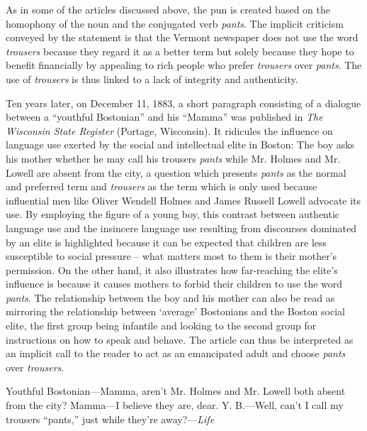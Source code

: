 As in some of the articles discussed above, the pun is created based on the homophony of the noun and the conjugated verb \emph{pants}. The implicit criticism conveyed by the statement is that the Vermont newspaper does not use the word \emph{trousers} because they regard it as a better term but solely because they hope to benefit financially by appealing to rich people who prefer \emph{trousers} over \emph{pants}. The use of \emph{trousers} is thus linked to a lack of integrity and authenticity.


Ten years later, on December 11, 1883, a short paragraph consisting of a dialogue between a “youthful Bostonian” and his “Mamma” was published in \emph{The Wisconsin State Register} (Portage, Wisconsin). It ridicules the influence on language use exerted by the social and intellectual elite in Boston: The boy asks his mother whether he may call his trousers \emph{pants} while Mr. Holmes and Mr. Lowell are absent from the city, a question which presents \emph{pants} as the normal and preferred term and \emph{trousers} as the term which is only used because influential men like Oliver Wendell Holmes and James Russell Lowell advocate its use. By employing the figure of a young boy, this contrast between authentic language use and the insincere language use resulting from discourses dominated by an elite is highlighted because it can be expected that children are less susceptible to social pressure – what matters most to them is their mother’s permission. On the other hand, it also illustrates how far-reaching the elite’s influence is because it causes mothers to forbid their children to use the word \emph{pants}. The relationship between the boy and his mother can also be read as mirroring the relationship between ‘average’ Bostonians and the Boston social elite, the first group being infantile and looking to the second group for instructions on how to speak and behave. The article can thus be interpreted as an implicit call to the reader to act as an emancipated adult and choose \emph{pants} over \emph{trousers}.

\begin{ipquote}
Youthful Bostonian—Mamma, aren’t Mr. Holmes and Mr. Lowell both absent from the city? Mamma—I believe they are, dear. Y. B.—Well, can’t I call my trousers “pants,” just while they’re away?—\textit{Life}
\end{ipquote}

